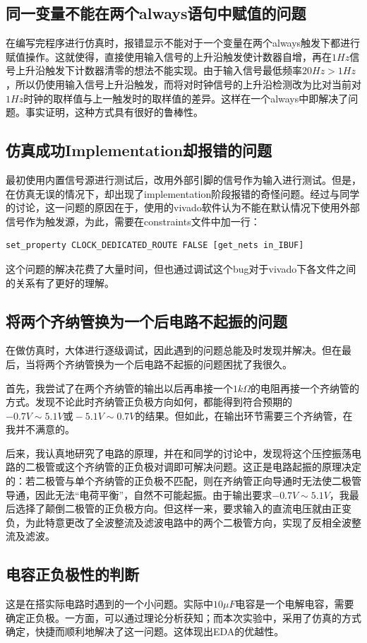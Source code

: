 \documentclass[12pt,a4paper]{article}
\begin{document}
\begin{spacing}{1.3}
\subsection{同一变量不能在两个always语句中赋值的问题}
在编写完程序进行仿真时，报错显示不能对于一个变量在两个always触发下都进行赋值操作。这就使得，直接使用输入信号的上升沿触发使计数器自增，再在$1Hz$信号上升沿触发下计数器清零的想法不能实现。由于输入信号最低频率$20Hz > 1Hz$，所以仍使用输入信号上升沿触发，而将对时钟信号的上升沿检测改为比对当前对$1Hz$时钟的取样值与上一触发时的取样值的差异。这样在一个always中即解决了问题。事实证明，这种方式具有很好的鲁棒性。
\subsection{仿真成功Implementation却报错的问题}
最初使用内置信号源进行测试后，改用外部引脚的信号作为输入进行测试。但是，在仿真无误的情况下，却出现了implementation阶段报错的奇怪问题。经过与同学的讨论，这一问题的原因在于，使用的vivado软件认为不能在默认情况下使用外部信号作为触发源，为此，需要在constraints文件中加一行：
{
\ttfamily
\begin{lstlisting}
set_property CLOCK_DEDICATED_ROUTE FALSE [get_nets in_IBUF]
\end{lstlisting} 
}
这个问题的解决花费了大量时间，但也通过调试这个bug对于vivado下各文件之间的关系有了更好的理解。
\subsection{将两个齐纳管换为一个后电路不起振的问题}
在做仿真时，大体进行逐级调试，因此遇到的问题总能及时发现并解决。但在最后，当将两个齐纳管换为一个后电路不起振的问题困扰了我很久。\par 
首先，我尝试了在两个齐纳管的输出以后再串接一个$1k\Omega$的电阻再接一个齐纳管的方式。发现不论此时齐纳管正负极方向如何，都能得到符合预期的$-0.7V\sim 5.1V或-5.1V\sim 0.7V$的结果。但如此，在输出环节需要三个齐纳管，在我并不满意的。\par 
后来，我认真地研究了电路的原理，并在和同学的讨论中，发现将这个压控振荡电路的二极管或这个齐纳管的正负极对调即可解决问题。这正是电路起振的原理决定的：若二极管与单个齐纳管的正负极不匹配，则在齐纳管正向导通时无法使二极管导通，因此无法“电荷平衡”，自然不可能起振。由于输出要求$-0.7V\sim 5.1V$，我最后选择了颠倒二极管的正负极方向。但这样一来，要求输入的直流电压就由正变负，为此特意更改了全波整流及滤波电路中的两个二极管方向，实现了反相全波整流及滤波。
\subsection{电容正负极性的判断}
这是在搭实际电路时遇到的一个小问题。实际中$10\mu F$电容是一个电解电容，需要确定正负极。一方面，可以通过理论分析获知；而本次实验中，采用了仿真的方式确定，快捷而顺利地解决了这一问题。这体现出EDA的优越性。

\end{spacing}
\end{document}
